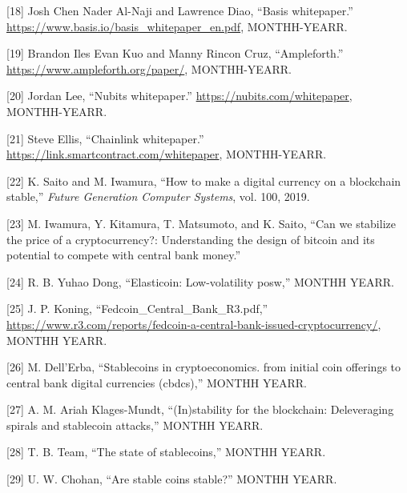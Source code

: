 \documentclass[english,]{IEEEtran}
\begin{document}
\hypertarget{ref-Basis:whitepaper}{}
{[}18{]} Josh Chen Nader Al-Naji and Lawrence Diao, ``Basis
whitepaper.'' \url{https://www.basis.io/basis_whitepaper_en.pdf},
MONTHH-YEARR.

\hypertarget{ref-Ampleforth:whitepaper}{}
{[}19{]} Brandon Iles Evan Kuo and Manny Rincon Cruz, ``Ampleforth.''
\url{https://www.ampleforth.org/paper/}, MONTHH-YEARR.

\hypertarget{ref-Nubits:whitepaper}{}
{[}20{]} Jordan Lee, ``Nubits whitepaper.''
\url{https://nubits.com/whitepaper}, MONTHH-YEARR.

\hypertarget{ref-Chainlink:whitepaper}{}
{[}21{]} Steve Ellis, ``Chainlink whitepaper.''
\url{https://link.smartcontract.com/whitepaper}, MONTHH-YEARR.

\hypertarget{ref-How_to_make_a_digital_currency_on_a_blockchain_stable}{}
{[}22{]} K. Saito and M. Iwamura, ``How to make a digital currency on a
blockchain stable,'' \emph{Future Generation Computer Systems}, vol.
100, 2019.

\hypertarget{ref-CanWeStabilize}{}
{[}23{]} M. Iwamura, Y. Kitamura, T. Matsumoto, and K. Saito, ``Can we
stabilize the price of a cryptocurrency?: Understanding the design of
bitcoin and its potential to compete with central bank money.''

\hypertarget{ref-Elasticoin_Low-Volatility_PoSW}{}
{[}24{]} R. B. Yuhao Dong, ``Elasticoin: Low-volatility posw,'' MONTHH
YEARR.

\hypertarget{ref-Fedcoin}{}
{[}25{]} J. P. Koning, ``Fedcoin\_Central\_Bank\_R3.pdf,''
\url{https://www.r3.com/reports/fedcoin-a-central-bank-issued-cryptocurrency/},
MONTHH YEARR.

\hypertarget{ref-Stablecoins_in_Cryptoeconomics}{}
{[}26{]} M. Dell'Erba, ``Stablecoins in cryptoeconomics. from initial
coin offerings to central bank digital currencies (cbdcs),'' MONTHH
YEARR.

\hypertarget{ref-In_stability_for_the_Blockchain}{}
{[}27{]} A. M. Ariah Klages-Mundt, ``(In)stability for the blockchain:
Deleveraging spirals and stablecoin attacks,'' MONTHH YEARR.

\hypertarget{ref-THE_STATE_OF_STABLECOINS}{}
{[}28{]} T. B. Team, ``The state of stablecoins,'' MONTHH YEARR.

\hypertarget{ref-Are_Stable_Coins_Stable}{}
{[}29{]} U. W. Chohan, ``Are stable coins stable?'' MONTHH YEARR.
\end{document}

